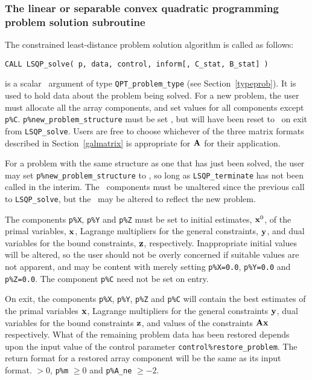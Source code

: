 \documentclass{galahad}
\newcommand{\packagename}{LSQP}
\begin{document}

\subsubsection{The linear or separable convex quadratic programming problem 
solution subroutine}
The  constrained least-distance problem solution algorithm is called as follows:
\vspace*{1mm}

\hspace{8mm}
{\tt CALL \packagename\_solve( p, data, control,  inform[, C\_stat, B\_stat] )}

\vspace*{-3mm}
\begin{description}
 is a scalar \intentinout\ argument of type 
{\tt QPT\_problem\_type}
(see Section~\ref{typeprob}). 
It is used to hold data about the problem being solved.
For a new problem, the user must allocate all the array components,
and set values for all components except {\tt p\%C}.
{\tt p\%new\_problem\_structure} must be set \true, but will have been reset
to \false\ on exit from {\tt \packagename\_solve}.
Users are free to choose whichever
of the three matrix formats described in Section~\ref{galmatrix} 
is appropriate for ${\mathbf{A}}$ for their application.

For a problem with the same structure as one that has just been 
solved, the user may set {\tt p\%new\_problem\_str\-u\-cture} to \false,
so long as {\tt \packagename\_terminate} has not been called in the interim.
The \integer\ components must be unaltered since the
previous call to {\tt \packagename\_solve}, but the \realdp\ 
may be altered to reflect the new problem.

The components {\tt p\%X}, {\tt p\%Y} and {\tt p\%Z}
must be set to initial estimates, ${\mathbf{x}}^{0}$, of the primal variables, 
${\mathbf{x}}$, Lagrange multipliers for the general constraints, ${\mathbf{y}}$, 
and dual variables for the bound constraints, ${\mathbf{z}}$, respectively.
Inappropriate initial values will be altered, so the user should
not be overly concerned if suitable values are not apparent, and may be
content with merely setting {\tt p\%X=0.0},
{\tt p\%Y=0.0} and {\tt p\%Z=0.0}.
The component {\tt p\%C} need not be set on entry.

On exit, the components {\tt p\%X}, {\tt p\%Y}, {\tt p\%Z} and {\tt p\%C}
will contain the best estimates of the primal variables ${\mathbf{x}}$, 
Lagrange multipliers for the general
constraints ${\mathbf{y}}$, dual variables for the bound constraints ${\mathbf{z}}$, 
and values of the constraints ${\mathbf{A}} {\mathbf{x}}$ respectively.
What of the remaining problem data has been restored depends upon
the input value of the control parameter {\tt control\%restore\_problem}.
The return format for a restored array component will be the same as its
input format.
 $> 0$, {\tt p\%m} $\geq 0$ and {\tt p\%A\_ne} 
              $\geq -2$.


\end{description}
\end{document}
